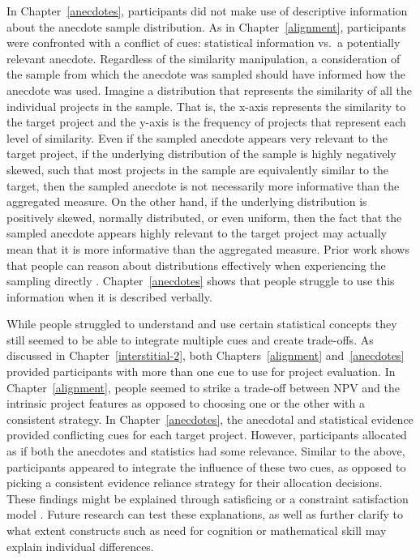 \documentclass[a4paper, nobind]{templates/ociamthesis}
\theoremstyle{definition}
\theoremstyle{definition}
\theoremstyle{definition}
\theoremstyle{definition}
\theoremstyle{remark}
\begin{document}
In Chapter~\ref{anecdotes}, participants did not make use of descriptive
information about the anecdote sample distribution. As in
Chapter~\ref{alignment}, participants were confronted with a conflict of cues:
statistical information vs.~a potentially relevant anecdote. Regardless of the
similarity manipulation, a consideration of the sample from which the anecdote
was sampled should have informed how the anecdote was used. Imagine a
distribution that represents the similarity of all the individual projects in
the sample. That is, the x-axis represents the similarity to the target project
and the y-axis is the frequency of projects that represent each level of
similarity. Even if the sampled anecdote appears very relevant to the target
project, if the underlying distribution of the sample is highly negatively
skewed, such that most projects in the sample are equivalently similar to the
target, then the sampled anecdote is not necessarily more informative than the
aggregated measure. On the other hand, if the underlying distribution is
positively skewed, normally distributed, or even uniform, then the fact that the
sampled anecdote appears highly relevant to the target project may actually mean
that it is more informative than the aggregated measure. Prior work shows that
people can reason about distributions effectively when experiencing the sampling
directly \autocites[e.g.,][]{hertwig2004,carvalho2021}. Chapter~\ref{anecdotes} shows
that people struggle to use this information when it is described verbally.

While people struggled to understand and use certain statistical concepts they
still seemed to be able to integrate multiple cues and create trade-offs. As
discussed in Chapter~\ref{interstitial-2}, both Chapters~\ref{alignment}
and~\ref{anecdotes} provided participants with more than one cue to use for
project evaluation. In Chapter~\ref{alignment}, people seemed to strike a
trade-off between NPV and the intrinsic project features as opposed to choosing
one or the other with a consistent strategy. In Chapter~\ref{anecdotes}, the
anecdotal and statistical evidence provided conflicting cues for each target
project. However, participants allocated as if both the anecdotes and statistics
had some relevance. Similar to the above, participants appeared to integrate the
influence of these two cues, as opposed to picking a consistent evidence
reliance strategy for their allocation decisions. These findings might be
explained through satisficing \autocite{simon1955} or a constraint satisfaction model
\autocite[e.g.,][]{glockner2014}. Future research can test these explanations, as well as
further clarify to what extent constructs such as need for cognition or
mathematical skill may explain individual differences.
\end{document}
